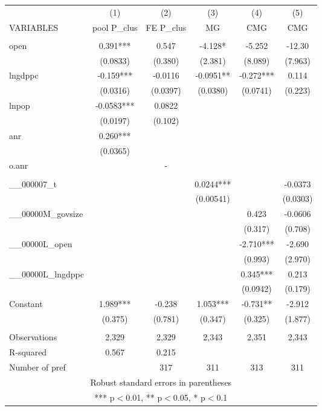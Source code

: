 \documentclass[]{article}
\begin{document}
\begin{tabular}{lccccc} \hline
 & (1) & (2) & (3) & (4) & (5) \\
VARIABLES & pool P\_clus & FE P\_clus & MG & CMG & CMG \\ \hline
 &  &  &  &  &  \\
open & 0.391*** & 0.547 & -4.128* & -5.252 & -12.30 \\
 & (0.0833) & (0.380) & (2.381) & (8.089) & (7.963) \\
lngdppc & -0.159*** & -0.0116 & -0.0951** & -0.272*** & 0.114 \\
 & (0.0316) & (0.0397) & (0.0380) & (0.0741) & (0.223) \\
lnpop & -0.0583*** & 0.0822 &  &  &  \\
 & (0.0197) & (0.102) &  &  &  \\
anr & 0.260*** &  &  &  &  \\
 & (0.0365) &  &  &  &  \\
o.anr &  & - &  &  &  \\
 &  &  &  &  &  \\
\_\_000007\_t &  &  & 0.0244*** &  & -0.0373 \\
 &  &  & (0.00541) &  & (0.0303) \\
\_\_00000M\_govsize &  &  &  & 0.423 & -0.0606 \\
 &  &  &  & (0.317) & (0.708) \\
\_\_00000L\_open &  &  &  & -2.710*** & -2.690 \\
 &  &  &  & (0.993) & (2.970) \\
\_\_00000L\_lngdppc &  &  &  & 0.345*** & 0.213 \\
 &  &  &  & (0.0942) & (0.179) \\
Constant & 1.989*** & -0.238 & 1.053*** & -0.731** & -2.912 \\
 & (0.375) & (0.781) & (0.347) & (0.325) & (1.877) \\
 &  &  &  &  &  \\
Observations & 2,329 & 2,329 & 2,343 & 2,351 & 2,343 \\
R-squared & 0.567 & 0.215 &  &  &  \\
 Number of pref &  & 317 & 311 & 313 & 311 \\ \hline
\multicolumn{6}{c}{ Robust standard errors in parentheses} \\
\multicolumn{6}{c}{ *** p$<$0.01, ** p$<$0.05, * p$<$0.1} \\
\end{tabular}
\end{document}
